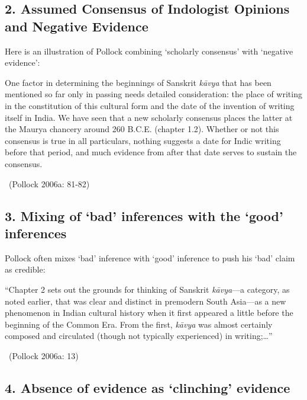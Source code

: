 \subsection*{2. Assumed Consensus of Indologist Opinions and Negative Evidence}

Here is an illustration of Pollock combining ‘scholarly consensus’ with ‘negative evidence’:

\begin{myquote}
One factor in determining the beginnings of Sanskrit \textit{kāvya} that has been mentioned so far only in passing needs detailed consideration: the place of writing in the constitution of this cultural form and the date of the invention of writing itself in India. We have seen that a new scholarly consensus places the latter at the Maurya chancery around 260 B.C.E. (chapter 1.2). Whether or not this consensus is true in all particulars, nothing suggests a date for Indic writing before that period, and much evidence from after that date serves to sustain the consensus. 

~\hfill (Pollock 2006a: 81-82)
\end{myquote}

\vspace{-.3cm}

\subsection*{3. Mixing of ‘bad’ inferences with the ‘good’ inferences}

Pollock often mixes ‘bad’ inference with ‘good’ inference to push his ‘bad’ claim as credible:

\begin{myquote}
“Chapter 2 sets out the grounds for thinking of Sanskrit \textit{kāvya}—a category, as noted earlier, that was clear and distinct in premodern South Asia—as a new phenomenon in Indian cultural history when it ﬁrst appeared a little before the beginning of the Common Era. From the ﬁrst, \textit{kāvya} was almost certainly composed and circulated (though not typically experienced) in writing;…” 

~\hfill (Pollock 2006a: 13)
\end{myquote}

\vspace{-.3cm}

\subsection*{4. Absence of evidence as ‘clinching’ evidence}

